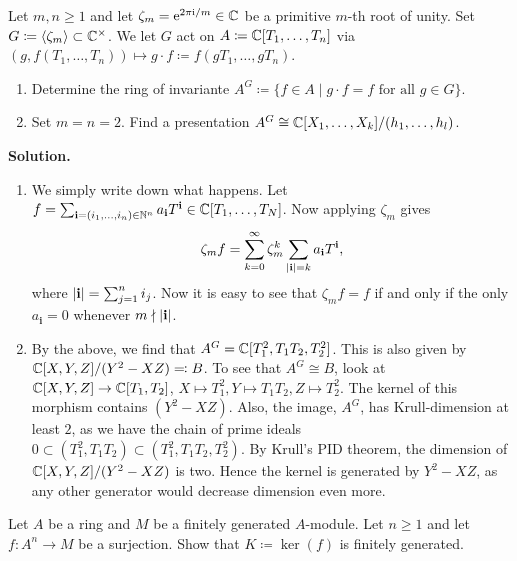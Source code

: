 \documentclass[a4paper,11pt]{article}
\begin{document}
Let $m, n \geq 1$ and let $\zeta_m = \mathrm e^{2 \pi \mathrm i / m} \in \mathbb{C}$ be a primitive
$m$-th root of unity. Set $G \coloneqq \langle \zeta_m \rangle \subset \mathbb{C}^\times$. 
We let $G$ act on $A \coloneqq \mathbb{C}[T_1, \dots, T_n]$ via $(g, f(T_1, \dots, T_n))
\mapsto g \cdot f \coloneqq f(gT_1, \dots, gT_n)$. 
\begin{enumerate}
    \item Determine the ring of invariante $A^G \coloneqq \{f \in A \mid 
        g \cdot f = f \text{ for all } g \in G\}$.
    \item Set $m = n = 2$. Find a presentation $A^G \cong \mathbb{C}[X_1, \dots, X_k]
        /(h_1, \dots, h_l)$. 
\end{enumerate}

\textbf{Solution.}
\begin{enumerate}
    \item We simply write down what happens. Let $f = \sum_{\mathbf i = (i_1, \dots, i_n) \in \mathbb{N}^n} a_{\mathbf i}T^{\mathbf i} \in \mathbb{C}[T_1, \dots, T_N]$. Now applying
        $\zeta_m$ gives 
        \begin{equation*}
            \zeta_m f = \sum_{k = 0}^\infty \zeta_m^{k}
            \sum_{\left\lvert \mathbf i \right\rvert= k} a_{\mathbf i}T^{\mathbf i},
        \end{equation*}
        where $\left\lvert \mathbf i \right\rvert = \sum_{j=1}^n i_j$. Now it is easy to see that 
        $\zeta_m f = f$ if and only if the only $a_{\mathbf i} = 0$ 
        whenever $m \nmid \left\lvert \mathbf i \right\rvert$. 
    \item By the above, we find that $A^G = \mathbb{C}[T_1^2, T_1T_2, T_2^2]$. 
        This is also given by $\mathbb{C}[X,Y,Z]/(Y^2 - XZ) \eqqcolon B$. To see 
        that $A^G \cong B$, look at 
        $\mathbb{C}[X,Y,Z] \to \mathbb{C}[T_1, T_2]$, $X \mapsto T_1^2, Y \mapsto T_1T_2, 
        Z \mapsto T_2^2$. The kernel of this morphism contains
        $(Y^2 - XZ)$. Also, the image, $A^G$, has Krull-dimension at least $2$, 
        as we have the chain of prime ideals $0 \subset (T_1^2, T_1T_2)
        \subset (T_1^2, T_1T_2, T_2^2)$. By Krull's PID theorem, the dimension
        of $\mathbb{C}[X,Y,Z]/(Y^2-XZ)$ is two. Hence the kernel is generated by 
        $Y^2-XZ$, as any other generator would decrease dimension even more.
\end{enumerate}


Let $A$ be a ring and $M$ be a finitely generated $A$-module. Let $n \geq 1$
and let $f: A^n \to M$ be a surjection. Show that $K \coloneqq \ker(f)$
is finitely generated.
\end{document}
